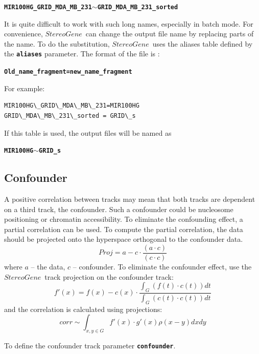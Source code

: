 \documentclass{article}
\newcommand{\prm}[1]{\texttt{\textbf{{#1}}}}
\newcommand{\sg}{$StereoGene$\ }
\begin{document}
\begin{center}
\prm{MIR100HG\_GRID\_MDA\_MB\_231}$\sim$\prm{GRID\_MDA\_MB\_231\_sorted} 
\end{center}

It is quite difficult to work with such long names, especially in batch mode.
For convenience, \sg can change the output file name by replacing parts of the name. To do the substitution, \sg uses the aliases table defined by the \prm{aliases} parameter. The format of the file is :
\begin{center}
\prm{Old\_name\_fragment=new\_name\_fragment} 
\end{center}
For example:

\begin{shaded} 
\begin{verbatim}
MIR100HG\_GRID\_MDA\_MB\_231=MIR100HG
GRID\_MDA\_MB\_231\_sorted = GRID\_s
\end{verbatim}
\end{shaded}

If this table is used, the output files will be named as
\begin{center}
\prm{MIR100HG}$\sim$\prm{GRID\_s} 
\end{center}


\subsection{Confounder}\label{confoud}
A positive correlation between tracks may mean that both tracks are dependent on a third track, the confounder.
Such a confounder could be nucleosome positioning or chromatin accessibility.
To eliminate the confounding effect, a partial correlation can be used. 
To compute the partial correlation, the data should be projected onto the hyperspace orthogonal to the confounder data.
$$
Proj=a-c\cdot\frac{(a\cdot c)}{(c\cdot c)}
$$
where $a$ -- the data, $c$ -- confounder. 
To eliminate the confounder effect, use the \sg track projection on the confounder track:
$$
f'(x)=f(x)-c(x)\cdot\frac{\int_G (f(t)\cdot c(t)) dt}{\int_G (c(t)\cdot c(t)) dt}
$$
and the correlation is calculated using projections:
$$
corr\sim \int_{x,y\in G} f'(x)\cdot g'(x) \rho(x-y) dx dy 
$$

To define the confounder track parameter \prm{confounder}.

\end{document}
